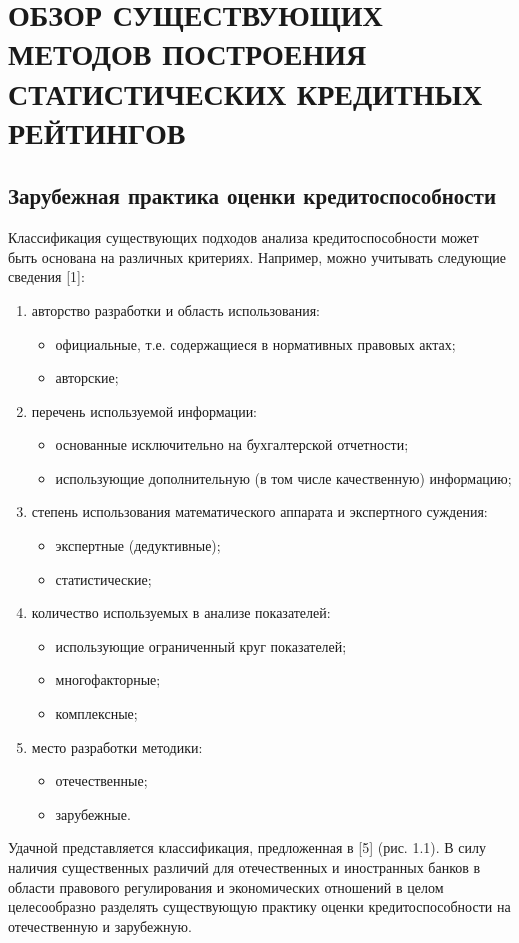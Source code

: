 \documentclass[14pt,a4paper]{extarticle}
\begin{document}
\clearpage

\section{ОБЗОР СУЩЕСТВУЮЩИХ МЕТОДОВ ПОСТРОЕНИЯ СТАТИСТИЧЕСКИХ КРЕДИТНЫХ РЕЙТИНГОВ}

\subsection{Зарубежная практика оценки кредитоспособности}

Классификация существующих подходов анализа кредитоспособности может быть основана на различных 
критериях. Например, можно учитывать следующие сведения [1]:
\begin{enumerate}
    \item авторство разработки и область использования:
    \begin{itemize}
        \item официальные, т.е. содержащиеся в нормативных правовых актах;
        \item авторские;
    \end{itemize}
    \item перечень используемой информации:
    \begin{itemize}
        \item основанные исключительно на бухгалтерской отчетности;
        \item использующие дополнительную (в том числе качественную) информацию;
    \end{itemize}
    \item степень использования математического аппарата и экспертного суждения:
    \begin{itemize}
        \item экспертные (дедуктивные);
        \item статистические;
    \end{itemize}
    \item количество используемых в анализе показателей:
    \begin{itemize}
        \item использующие ограниченный круг показателей;
        \item многофакторные;
        \item комплексные;
    \end{itemize}
    \item место разработки методики:
    \begin{itemize}
        \item отечественные;
        \item зарубежные.
    \end{itemize}
\end{enumerate}
Удачной представляется классификация, предложенная в [5] (рис. 1.1). В силу наличия существенных 
различий для отечественных и иностранных банков в области правового регулирования и экономических 
отношений в целом целесообразно разделять существующую практику оценки кредитоспособности на 
отечественную и зарубежную.
\end{document}
